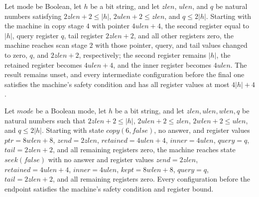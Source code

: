 \begin{lemma}
\label{Complexity.drop_u_prepare}
\leanok
{}
Let $\mathrm{mode}$ be Boolean, let $h$ be a bit string, and let $zlen$, $ulen$, and $q$
be natural numbers satisfying $2zlen+2\le |h|$, $2ulen+2\le zlen$, and $q\le 2|h|$.
Starting with the machine in copy stage $4$ with pointer $4ulen+4$, the second register
equal to $|h|$, query register $q$, tail register $2zlen+2$, and all other registers
zero, the machine reaches scan stage $2$ with those pointer, query, and tail values
changed to zero, $q$, and $2zlen+2$, respectively; the second register remains $|h|$,
the retained register becomes $4ulen+4$, and the inner register becomes $4ulen$. The
result remains unset, and every intermediate configuration before the final one
satisfies the machine's safety condition and has all register values at most $4|h|+4$.
\end{lemma}

\begin{lemma}
\label{Complexity.drop_lookup_prepare}
\leanok
{}
Let $mode$ be a Boolean mode, let $h$ be a bit string, and let $zlen, ulen, wlen, q$ be
natural numbers such that $2zlen+2\le |h|$, $2ulen+2\le zlen$, $2wlen+2\le ulen$, and
$q\le 2|h|$. Starting with state $copy(6,false)$, no answer, and register values
$ptr=8wlen+8$, $zend=2zlen$, $retained=4ulen+4$, $inner=4ulen$, $query=q$,
$tail=2zlen+2$, and all remaining registers zero, the machine reaches state
$seek(false)$ with no answer and register values $zend=2zlen$, $retained=4ulen+4$,
$inner=4ulen$, $kept=8wlen+8$, $query=q$, $tail=2zlen+2$, and all remaining registers
zero. Every configuration before the endpoint satisfies the machine's safety condition
and register bound.
\end{lemma}

